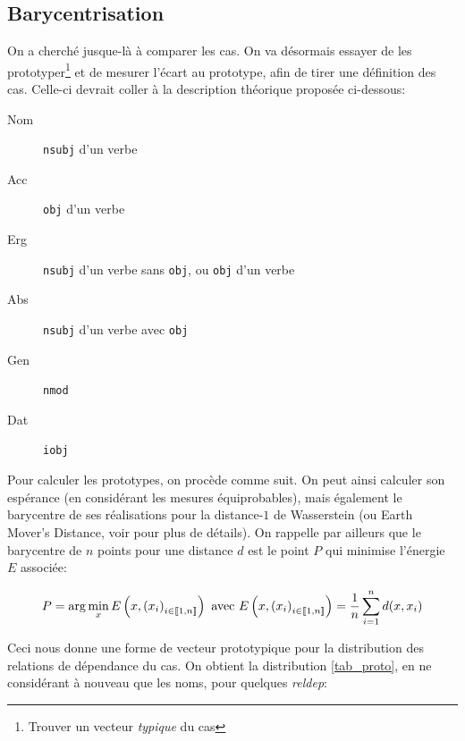 \documentclass{cours}
\begin{document}
\subsection{Barycentrisation}\label{subsec:bary}
On a cherché jusque-là à comparer les cas.
On va désormais essayer de les prototyper\footnote{Trouver un vecteur \textit{typique} du cas} et de mesurer l'écart au prototype, afin de tirer une définition des cas.
Celle-ci devrait coller à la description théorique proposée ci-dessous:
\begin{multicols}{2}
	\begin{description}
		\item[Nom] \texttt{nsubj} d'un verbe
		\item[Acc] \texttt{obj} d'un verbe
		\item[Erg] \texttt{nsubj} d'un verbe sans \texttt{obj}, ou \texttt{obj} d'un verbe
		\item[Abs] \texttt{nsubj} d'un verbe avec \texttt{obj}
		\item[Gen] \texttt{nmod}
		\item[Dat] \texttt{iobj}
	\end{description}
\end{multicols}
Pour calculer les prototypes, on procède comme suit.
On peut ainsi calculer son espérance (en considérant les mesures équiprobables), mais également le barycentre de ses réalisations pour la distance-$1$ de Wasserstein (ou Earth Mover's Distance, voir \cite{PythonPOT} pour plus de détails).
On rappelle par ailleurs que le barycentre de $n$ points pour une distance $d$ est le point $P$ qui minimise l'énergie $E$ associée:

\begin{equation*}
	P = \arg\min_{x} E\left(x, \left(x_{i}\right)_{i \in \left\llbracket 1, n\right\rrbracket}\right) \text{ avec } E\left(x, \left(x_{i}\right)_{i \in \left\llbracket 1, n\right\rrbracket}\right) = \frac{1}{n}\sum_{i = 1}^{n} d(x, x_{i})
\end{equation*}

Ceci nous donne une forme de vecteur prototypique pour la distribution des relations de dépendance du cas.
On obtient la distribution \ref{tab_proto}, en ne considérant à nouveau que les noms, pour quelques \textit{reldep}:
\end{document}
